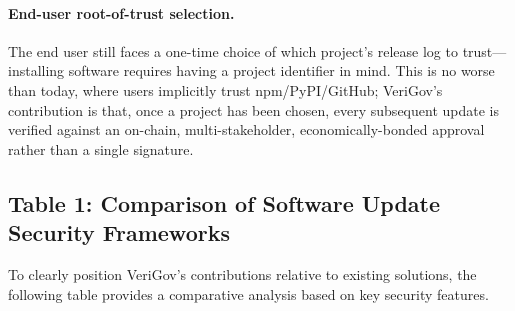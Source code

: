 \documentclass{article}
\begin{document}
\paragraph{End-user root-of-trust selection.} The end user still faces a one-time choice of which project's release log to trust---installing software requires having a project identifier in mind. This is no worse than today, where users implicitly trust npm/PyPI/GitHub; VeriGov's contribution is that, once a project has been chosen, every subsequent update is verified against an on-chain, multi-stakeholder, economically-bonded approval rather than a single signature.

\subsection{Table 1: Comparison of Software Update Security Frameworks}

To clearly position VeriGov's contributions relative to existing solutions, the following table provides a comparative analysis based on key security features.
\end{document}
